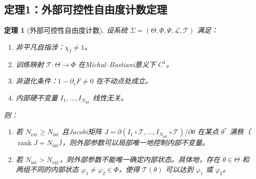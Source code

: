 \documentclass[12pt,a4paper]{article}
\newtheorem{theorem}{定理}[section]
\theoremstyle{definition}
\newcommand{\mL}{\mathcal{L}}
\newcommand{\mT}{\mathcal{T}}
\newcommand{\mPhi}{\Phi}
\newcommand{\mPsi}{\Psi}
\newcommand{\mTheta}{\Theta}
\newcommand{\chiI}{\chi_I}
\newcommand{\Nint}{N_{\mathrm{int}}}
\newcommand{\Next}{N_{\mathrm{ext}}}
\newcommand{\rank}{\operatorname{rank}}
\begin{document}
\subsection{定理1：外部可控性自由度计数定理}

\begin{theorem}[外部可控性自由度计数]
\label{thm:t1}
设系统 $\Sigma = (\mTheta, \mPhi, \mPsi, \mL, \mT)$ 满足：
\begin{enumerate}[label=(A\arabic*)]
\item 非平凡自指涉：$\chiI \neq 1$。
\item 训练映射 $\mT: \mTheta \to \mPhi$ 在Michal--Bastiani意义下 $C^1$。
\item 非退化条件：$1 - \partial_s F \neq 0$ 在不动点处成立。
\item 内部硬不变量 $I_1, \ldots, I_{\Nint}$ 线性无关。
\end{enumerate}
则：
\begin{enumerate}[label=(T1-\alph*)]
\item 若 $\Next \geq \Nint$ 且Jacobi矩阵 $J = \partial(I_1 \circ \mT, \ldots, I_{\Nint} \circ \mT)/\partial\theta$ 在某点 $\theta^*$ 满秩（$\rank J = \Nint$），则外部参数可以局部唯一地控制内部不变量。
\item 若 $\Nint > \Next$，则外部参数不能唯一确定内部状态。具体地，存在 $\theta \in \mTheta$ 和两组不同的内部状态 $\varphi_1 \neq \varphi_2 \in \mPhi$，使得 $\mT(\theta)$ 可以达到 $\varphi_1$ 或 $\varphi_2$。
\end{enumerate}
\end{theorem}
\end{document}

